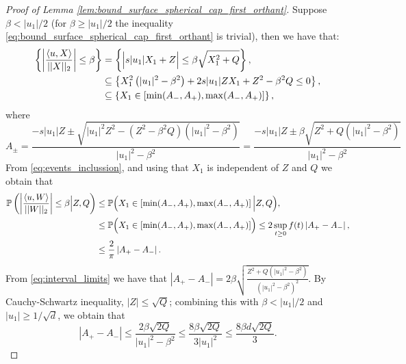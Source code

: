 \documentclass{article}
\numberwithin{equation}{section}
\renewcommand{\P}{\mathbb{P}}
\newcommand{\innerprod}[2]{\left\langle #1, #2 \right\rangle}
\begin{document}
\begin{proof}[Proof of Lemma
    \ref{lem:bound_surface_spherical_cap_first_orthant}]
    Suppose
    \(\beta<|u_1|/2\) (for \(\beta\geq |u_1|/2\) the inequality
        \eqref{eq:bound_surface_spherical_cap_first_orthant} is
    trivial), then we have that:
    \begin{align}
        \left\{\left|
        \frac{\innerprod{u}{X}}{||X||_2} \right|\leq \beta\right\} &=
        \left\{ \Bigl|s|u_1|X_1+Z\Bigr|\leq \beta\sqrt{X_1^2+Q}
        \right\},\nonumber \\
        &\subseteq \left\{ X_1^2\left(|u_1|^2-\beta^2\right) +
        2s|u_1|ZX_1+Z^2-\beta^2Q\leq 0 \right\},\nonumber \\
        &\subseteq \left\{ X_1\in
        \left[\min(A_{-},A_{+}),\max(A_{-},A_{+})\right]\right\}\label{eq:events_inclussion},
    \end{align}
    where
    \begin{equation}\label{eq:interval_limits}
        A_{\pm}=\frac{-s|u_1|Z\pm\sqrt{|u_1|^2Z^2-\left(Z^2-\beta^2Q\right)
        \left(|u_1|^2-\beta^2\right) }}{|u_1|^2-\beta^2} =
        \frac{-s|u_1|Z\pm\beta\sqrt{ Z^2+Q(|u_1|^2-\beta^2) }}{|u_1|^2-\beta^2}
    \end{equation}
    From \eqref{eq:events_inclussion}, and using that \(X_1\) is
    independent of \(Z\) and \(Q\) we obtain that
    \begin{align}
        \P\left( \left|
            \frac{\innerprod{u}{W}}{||W||_2} \right|\leq \beta
        \Bigl.\Bigr| Z,Q \right)
        &\leq \P\Bigl( X_1\in
            \left[\min(A_{-},A_{+}),\max(A_{-},A_{+})\right] \Bigl.\Bigr|
        Z,Q \Bigr),\nonumber\\
        &\leq \P\Bigl( X_1\in
        \left[\min(A_{-},A_{+}),\max(A_{-},A_{+})\right] \Bigr)\leq
        2\sup_{t\geq 0}f(t)\left| A_+-A_{-} \right|,\nonumber\\
        &\leq\frac{2}{\pi}\left| A_+-A_{-}
        \right|.\label{eq:conditional_prob_bound}
    \end{align}
    From \eqref{eq:interval_limits} we have that \(\left| A_+-A_{-}\right| =
    2\beta\sqrt{\frac{Z^2+Q(|u_1|^2-\beta^2)}{(|u_1|^2-\beta^2)^2}}\). By
    Cauchy-Schwartz inequality, \(|Z|\leq\sqrt{Q}\); combining this
    with \(\beta<|u_1|/2\) and \(|u_1|\geq 1/\sqrt{d}\), we obtain that
    \begin{equation}\label{eq:interval_size_bound}
        \left| A_+-A_{-}\right|\leq
        \frac{2\beta\sqrt{2Q}}{|u_1|^2-\beta^2}\leq
        \frac{8\beta\sqrt{2Q}}{3|u_1|^2}\leq
        \frac{8\beta d\sqrt{2Q}}{3}.
    \end{equation}
  

\end{proof}
\end{document}
